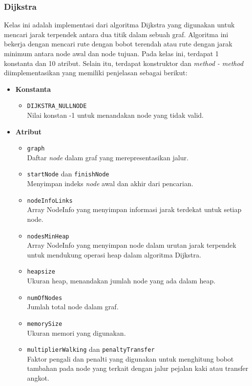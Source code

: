 \subsubsection{Dijkstra}
\label{subss:dijkstra}
Kelas ini adalah implementasi dari algoritma Dijkstra yang digunakan untuk mencari jarak terpendek antara dua titik dalam sebuah graf. Algoritma ini bekerja dengan mencari rute dengan bobot terendah atau rute dengan jarak minimum antara node awal dan node tujuan. Pada kelas ini, terdapat 1 konstanta dan 10 atribut. Selain itu, terdapat konstruktor dan \textit{method - method} diimplementasikan yang memiliki penjelasan sebagai berikut:
\begin{itemize}
    \item \textbf{Konstanta}
    \begin{itemize}
        \item \texttt{DIJKSTRA\_NULLNODE}
        \\ Nilai konstan -1 untuk menandakan node yang tidak valid.
    \end{itemize}

    \item \textbf{Atribut}
    \begin{itemize}
        \item \texttt{graph}
        \\ Daftar \textit{node} dalam graf yang merepresentasikan jalur.
        \item \texttt{startNode} dan \texttt{finishNode}
        \\ Menyimpan indeks \textit{node} awal dan akhir dari pencarian.
        \item \texttt{nodeInfoLinks}
        \\ Array NodeInfo yang menyimpan informasi jarak terdekat untuk setiap node.
        \item \texttt{nodesMinHeap}
        \\ Array NodeInfo yang menyimpan node dalam urutan jarak terpendek untuk mendukung operasi heap dalam algoritma Dijkstra.
        \item \texttt{heapsize}
        \\ Ukuran heap, menandakan jumlah node yang ada dalam heap.
        \item \texttt{numOfNodes}
        \\ Jumlah total node dalam graf.
        \item \texttt{memorySize}
        \\ Ukuran memori yang digunakan.
        \item \texttt{multiplierWalking} dan \texttt{penaltyTransfer}
        \\ Faktor pengali dan penalti yang digunakan untuk menghitung bobot tambahan pada node yang terkait dengan jalur pejalan kaki atau transfer angkot.
    \end{itemize}


\end{itemize}
